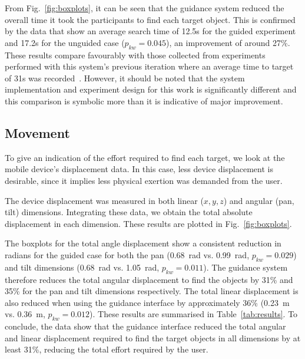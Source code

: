 \documentclass[runningheads]{llncs}
\DeclareRobustCommand{\tofix}[1]{{\sethlcolor{yellow}\hl{[#1]}}}
\begin{document}
From Fig.~\ref{fig:boxplots}, it can be seen that the guidance system reduced the overall time it took the participants to find each target object.
This is confirmed by the data that show an average search time of 12.5s for the guided experiment and 17.2s for the unguided case ($p_{kw}=0.045$), an improvement of around 27\%.
These results compare favourably with those collected from experiments performed with this system's previous iteration where an average time to target of 31s was recorded~\cite{lock2019active}. 
However, it should be noted that the system implementation and experiment design for this work is significantly different and this comparison is symbolic more than it is indicative of major improvement.

\subsection{Movement}

To give an indication of the effort required to find each target, we look at the mobile device's displacement data. 
In this case, less device displacement is desirable, since it implies less physical exertion was demanded from the user.

The device displacement was measured in both linear ($x, y, z$) and angular (pan, tilt) dimensions.
Integrating these data, we obtain the total absolute displacement in each dimension.
These results are plotted in Fig.~\ref{fig:boxplots}.


The boxplots for the total angle displacement show a consistent reduction in radians for the guided case for both the pan (\SI{0.68}{\radian} vs. \SI{0.99}{\radian}, $p_{kw}=0.029$) and tilt dimensions (\SI{0.68}{\radian} vs. \SI{1.05}{\radian}, $p_{kw}=0.011$). 
The guidance system therefore reduces the total angular displacement to find the objects by 31\% and 35\% for the pan and tilt dimensions respectively. 
The total linear displacement is also reduced when using the guidance interface by approximately 36\% (\SI{0.23}{\metre} vs. \SI{0.36}{\metre}, $p_{kw}=0.012$).
These results are summarised in Table~\ref{tab:results}.
To conclude, the data show that the guidance interface reduced the total angular and linear displacement required to find the target objects in all dimensions by at least 31\%, reducing the total effort required by the user. 
\end{document}

